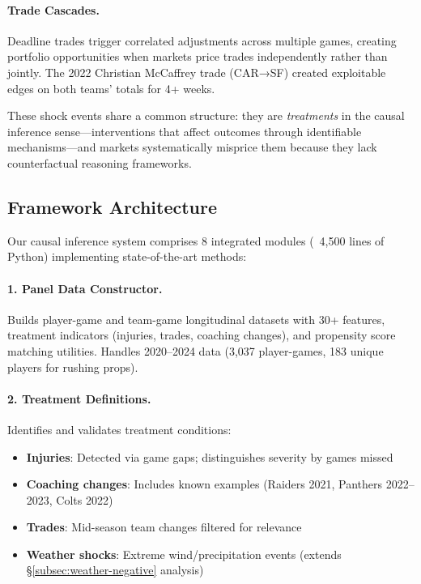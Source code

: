 \paragraph{Trade Cascades.}
Deadline trades trigger correlated adjustments across multiple games, creating portfolio opportunities when markets price trades independently rather than jointly. The 2022 Christian McCaffrey trade (CAR→SF) created exploitable edges on both teams' totals for 4+ weeks.

These shock events share a common structure: they are \emph{treatments} in the causal inference sense—interventions that affect outcomes through identifiable mechanisms—and markets systematically misprice them because they lack counterfactual reasoning frameworks.

\subsection{Framework Architecture}

Our causal inference system comprises 8 integrated modules (~4,500 lines of Python) implementing state-of-the-art methods:

\paragraph{1. Panel Data Constructor.}
Builds player-game and team-game longitudinal datasets with 30+ features, treatment indicators (injuries, trades, coaching changes), and propensity score matching utilities. Handles 2020--2024 data (3,037 player-games, 183 unique players for rushing props).

\paragraph{2. Treatment Definitions.}
Identifies and validates treatment conditions:
\begin{itemize}
  \item \textbf{Injuries}: Detected via game gaps; distinguishes severity by games missed
  \item \textbf{Coaching changes}: Includes known examples (Raiders 2021, Panthers 2022--2023, Colts 2022)
  \item \textbf{Trades}: Mid-season team changes filtered for relevance
  \item \textbf{Weather shocks}: Extreme wind/precipitation events (extends \S\ref{subsec:weather-negative} analysis)
\end{itemize}

